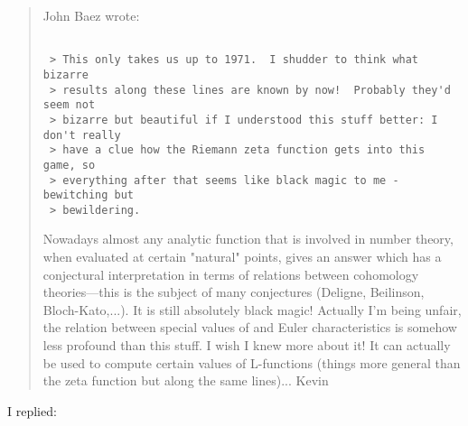 \begin{quote}
 John Baez wrote:

\begin{verbatim}

 > This only takes us up to 1971.  I shudder to think what bizarre
 > results along these lines are known by now!  Probably they'd seem not
 > bizarre but beautiful if I understood this stuff better: I don't really
 > have a clue how the Riemann zeta function gets into this game, so
 > everything after that seems like black magic to me - bewitching but
 > bewildering.
\end{verbatim}
    
 Nowadays almost any analytic function that is involved in number
 theory, when evaluated at certain "natural" points, gives
 an answer which has a conjectural interpretation in terms
 of relations between cohomology theories---this is the
 subject of many conjectures (Deligne, Beilinson, Bloch-Kato,...).
 It is still absolutely black magic! Actually I'm being unfair,
 the relation between special values of \zeta  and Euler characteristics
 is somehow less profound than this stuff. I wish I knew more about it!
 It can actually be used to compute certain values of L-functions
 (things more general than the zeta function but along the same lines)...
 Kevin
\end{quote}

I replied:

